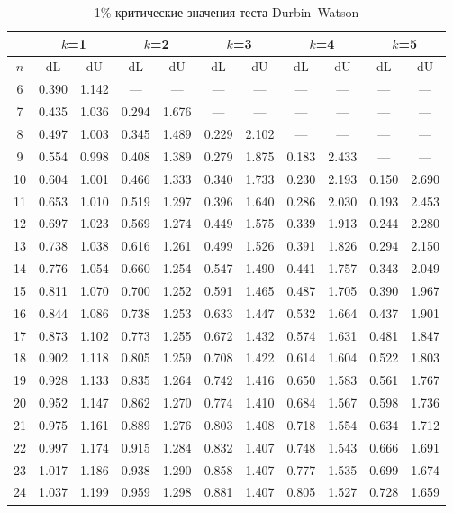 \documentclass[12pt]{article}
\begin{document}
\begin{table}
\caption{1\% критические значения теста Durbin--Watson}
\begin{center}
{\footnotesize
\begin{tabular}{|c|c|c|c|c|c|c|c|c|c|c|}
	\hline
	& \multicolumn{2}{c|}{$k$=1} & \multicolumn{2}{c|}{$k$=2}&
	\multicolumn{2}{c|}{$k$=3} & \multicolumn{2}{c|}{$k$=4} &
	\multicolumn{2}{c|}{$k$=5} \\ \hline
	$n$ & dL& dU& dL &dU & dL &dU &dL& dU &dL& dU\\ \hline
	6& 0.390&1.142&---&---&---&---&---&---&---&---\\
	7&0.435&1.036&0.294&1.676&---&---&---&---&---&---\\
	8&0.497&1.003&0.345&1.489&	0.229&2.102&---&---&---&---\\
	9&0.554&0.998&0.408&1.389&0.279&1.875& 0.183&2.433&---&---\\
	10&0.604&1.001&0.466&1.333&0.340&1.733&0.230&2.193& 0.150&2.690\\
	11&0.653&1.010&0.519&1.297&0.396&1.640&0.286&2.030&0.193&2.453\\
	12&0.697&1.023&0.569&1.274&0.449&1.575&0.339&1.913&0.244&2.280\\
	13&0.738&1.038&0.616&1.261&0.499&1.526&0.391&1.826&0.294&2.150\\
	14&0.776&1.054&0.660&1.254&0.547&1.490&0.441&1.757&0.343&2.049\\
	15&0.811&1.070&0.700&1.252&0.591&1.465&0.487&1.705&0.390&1.967\\
	16&0.844&1.086&0.738&1.253&0.633&1.447&0.532&1.664&0.437&1.901\\
	17&0.873&1.102&0.773&1.255&0.672&1.432&0.574&1.631&0.481&1.847\\
	18&0.902&1.118&0.805&1.259&0.708&1.422&0.614&1.604&0.522&1.803\\
	19&0.928&1.133&0.835&1.264&0.742&1.416&0.650&1.583&0.561&1.767\\
	20&0.952&1.147&0.862&1.270&0.774&1.410&0.684&1.567&0.598&1.736\\
	21&0.975&1.161&0.889&1.276&0.803&1.408&0.718&1.554&0.634&1.712\\
	22&0.997&1.174&0.915&1.284&0.832&1.407&0.748&1.543&0.666&1.691\\
	23&1.017&1.186&0.938&1.290&0.858&1.407&0.777&1.535&0.699&1.674\\
	24&1.037&1.199&0.959&1.298&0.881&1.407&0.805&1.527&0.728&1.659\\

\end{tabular}}
\end{center}
\end{table}
\end{document}
